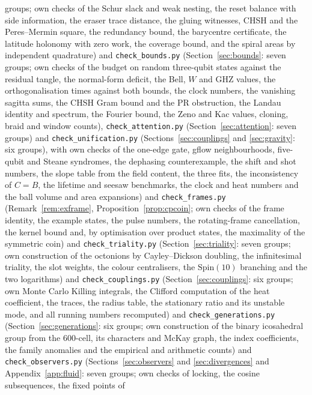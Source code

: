 \documentclass[aps,pra,onecolumn,superscriptaddress,nofootinbib,10pt]{revtex4-2}
\theoremstyle{definition}
\theoremstyle{remark}
\begin{document}
{groups; own checks of the Schur slack and weak nesting, the reset balance with side information, the
eraser trace distance, the gluing witnesses, CHSH and the Peres--Mermin square, the redundancy bound,
the barycentre certificate, the latitude holonomy with zero work, the coverage bound, and the spiral
areas by independent quadrature) and \texttt{check\_bounds.py} (Section~\ref{sec:bounds}: seven groups;
own checks of the budget on random three-qubit states against the residual tangle, the normal-form
deficit, the Bell, $W$ and GHZ values, the orthogonalisation times against both bounds, the clock numbers,
the vanishing sagitta sums, the CHSH Gram bound and the PR obstruction, the Landau identity and
spectrum, the Fourier bound, the Zeno and Kac values, cloning, braid and window counts), \texttt{check\_attention.py} (Section~\ref{sec:attention}: seven groups) and
\texttt{check\_unification.py} (Sections~\ref{sec:couplings} and \ref{sec:gravity}: six groups), with own checks of the one-edge gate,
gflow neighbourhoods, five-qubit and Steane syndromes, the dephasing counterexample, the shift and shot
numbers, the slope table from the field content, the three fits, the inconsistency of $C=B$, the lifetime
and seesaw benchmarks, the clock and heat numbers and the ball volume and area expansions) and \texttt{check\_frames.py} (Remark~\ref{rem:exframe},
Proposition~\ref{prop:cpcoin}; own checks of the frame identity, the example states, the pulse numbers, the
rotating-frame cancellation, the kernel bound and, by optimisation over product states, the maximality
of the symmetric coin) and \texttt{check\_triality.py} (Section~\ref{sec:triality}: seven groups;
own construction of the octonions by Cayley--Dickson doubling, the infinitesimal triality, the slot
weights, the colour centralisers, the $\mathrm{Spin}(10)$ branching and the two logarithms) and \texttt{check\_couplings.py} (Section~\ref{sec:couplings}: six groups; own Monte Carlo Killing
integrals, the Clifford computation of the heat coefficient, the traces, the radius table, the stationary
ratio and its unstable mode, and all running numbers recomputed) and \texttt{check\_generations.py} (Section~\ref{sec:generations}: six groups; own
construction of the binary icosahedral group from the $600$-cell, its characters and McKay graph, the index
coefficients, the family anomalies and the empirical and arithmetic counts) and \texttt{check\_observers.py} (Sections~\ref{sec:observers} and \ref{sec:divergences} and
Appendix~\ref{app:fluid}: seven groups; own checks of locking, the cosine subsequences, the fixed points of
}
\end{document}
